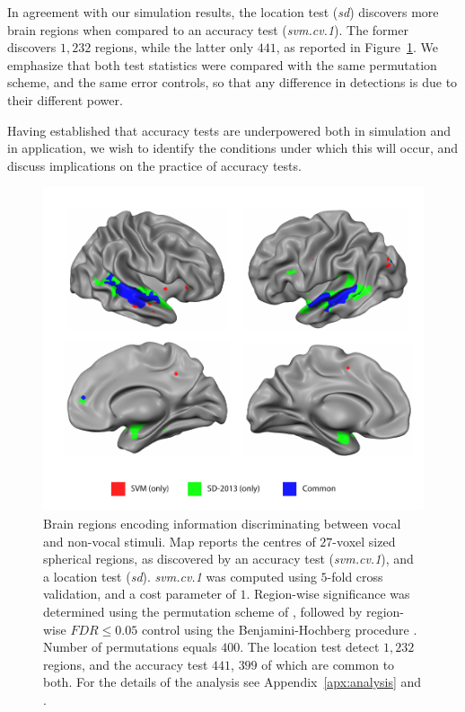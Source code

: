 \documentclass[12pt,a4paper]{article}
\begin{document}
In agreement with our simulation results, the location test (\emph{sd}) discovers more brain regions when compared to an accuracy test (\emph{svm.cv.1}).
The former discovers $1,232$ regions, while the latter only $441$, as reported in Figure~\ref{fig:read_data}.
We emphasize that both test statistics were compared with the same permutation scheme, and the same error controls, so that any difference in detections is due to their different power.

Having established that accuracy tests are underpowered both in simulation and in application, we wish to identify the conditions under which this will occur, and discuss implications on the practice of accuracy tests. 


\begin{figure}[th]
\centering
\includegraphics[width=0.7\linewidth]{"art/svm_vs_SD"}
\caption{\footnotesize
Brain regions encoding information discriminating between vocal and non-vocal stimuli.
Map reports the centres of $27$-voxel sized spherical regions, as discovered by an accuracy test (\emph{svm.cv.1}), and a location test (\emph{sd}). 
\emph{svm.cv.1} was computed using $5$-fold cross validation, and a cost parameter of $1$. 
Region-wise significance was determined using the permutation scheme of \cite{stelzer_statistical_2013}, followed by region-wise $FDR \leq 0.05$ control using the Benjamini-Hochberg procedure \citep{benjamini_controlling_1995}.
Number of permutations equals $400$.
The location test detect $1,232$ regions, and the accuracy test $441$, $399$ of which are common to both.
For the details of the analysis see Appendix~\ref{apx:analysis} and \cite{gilron_quantifying_2016}.  
  }
\label{fig:read_data}
\end{figure}
\end{document}
